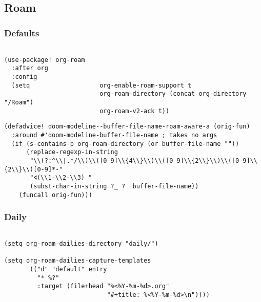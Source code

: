 \documentclass[c]{article}
\theoremstyle{plain}%
\theoremstyle{definition}
\theoremstyle{remark}
\begin{document}
\subsection{Roam}
\label{sec:orgcd17f30}
\subsubsection{Defaults}
\label{sec:org5532d0e}
\begin{verbatim}

(use-package! org-roam
  :after org
  :config
  (setq                   org-enable-roam-support t
                          org-roam-directory (concat org-directory "/Roam")
                          org-roam-v2-ack t))

\end{verbatim}
\begin{verbatim}
(defadvice! doom-modeline--buffer-file-name-roam-aware-a (orig-fun)
  :around #'doom-modeline-buffer-file-name ; takes no args
  (if (s-contains-p org-roam-directory (or buffer-file-name ""))
      (replace-regexp-in-string
       "\\(?:^\\|.*/\\)\\([0-9]\\{4\\}\\)\\([0-9]\\{2\\}\\)\\([0-9]\\{2\\}\\)[0-9]*-"
       "🢔(\\1-\\2-\\3) "
       (subst-char-in-string ?_ ?  buffer-file-name))
    (funcall orig-fun)))
\end{verbatim}
\subsubsection{Daily}
\label{sec:org3b27053}
\begin{verbatim}

(setq org-roam-dailies-directory "daily/")

(setq org-roam-dailies-capture-templates
      '(("d" "default" entry
         "* %?"
         :target (file+head "%<%Y-%m-%d>.org"
                            "#+title: %<%Y-%m-%d>\n"))))
\end{verbatim}
\end{document}
